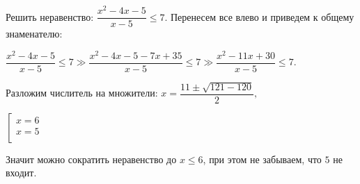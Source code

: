  Решить неравенство: $\dfrac{x^2-4x-5}{x-5}\leq7.$
\Solution Перенесем все влево и приведем к общему знаменателю:
\begin{center}
$\dfrac{x^2-4x-5}{x-5}\leq7\gg \dfrac{x^2-4x-5-7x+35}{x-5}\leq7\gg \dfrac{x^2-11x+30}{x-5}\leq7.$

Разложим числитель на множители:
$x=\dfrac{11\pm\sqrt{121-120}}{2},$

$\left[
  \begin{array}{ccc}
    x=6 \\
    x=5 \\
  \end{array}
\right.$

Значит можно сократить неравенство до $x\leq6$, при этом не забываем, что $5$ не входит.

\end{center}
\Answer{$(-\infty; 6]\setminus\{5\}$}